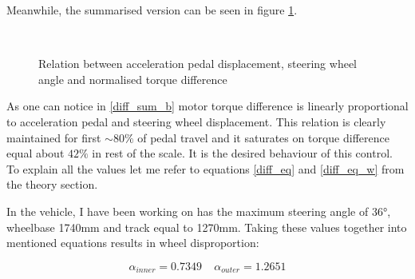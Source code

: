 Meanwhile, the summarised version can be seen in figure \ref{diff_sum}.

\begin{figure}[h]
    \centering
        ~
        \caption{Relation between acceleration pedal displacement, steering wheel angle and normalised torque difference}
    \label{diff_sum}
\end{figure}

As one can notice in \ref{diff_sum_b} motor torque difference is linearly proportional to acceleration pedal and steering wheel displacement. This relation is clearly maintained for first $\sim80\%$ of pedal travel and it saturates on torque difference equal about $42\%$ in rest of the scale. It is the desired behaviour of this control. To explain all the values let me refer to equations \ref{diff_eq} and \ref{diff_eq_w} from the theory section.

In the vehicle, I have been working on has the maximum steering angle of 36°, wheelbase 1740mm and track equal to 1270mm. Taking these values together into mentioned equations results in wheel disproportion: 

\begin{equation*}
    \alpha_{inner} = 0.7349 ~~~~~
    \alpha_{outer} = 1.2651
\end{equation*}

